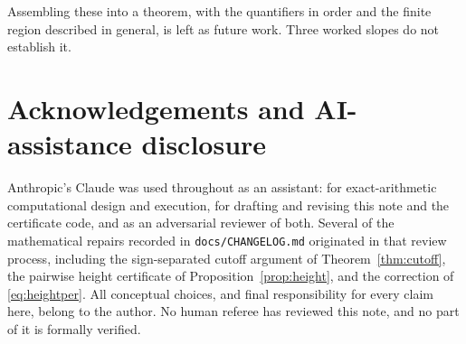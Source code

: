 \documentclass[11pt]{article}
\theoremstyle{definition}
\theoremstyle{remark}
\begin{document}
Assembling these into a theorem, with the quantifiers in order and the finite region described
in general, is left as future work. Three worked slopes do not establish it.

\section*{Acknowledgements and AI-assistance disclosure}

Anthropic's Claude was used throughout as an assistant: for exact-arithmetic computational
design and execution, for drafting and revising this note and the certificate code, and as an
adversarial reviewer of both. Several of the mathematical repairs recorded in
\texttt{docs/CHANGELOG.md} originated in that review process, including the sign-separated
cutoff argument of Theorem~\ref{thm:cutoff}, the pairwise height certificate of
Proposition~\ref{prop:height}, and the correction of \eqref{eq:heightper}. All conceptual
choices, and final responsibility for every claim here, belong to the author. No human referee
has reviewed this note, and no part of it is formally verified.
\end{document}
